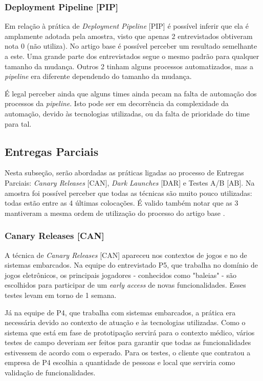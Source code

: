 \subsubsection{Deployment Pipeline [PIP]}

Em relação à prática de \emph{Deployment Pipeline} [PIP] é possível inferir que ela é amplamente adotada pela amostra, visto que apenas 2 entrevistados obtiveram nota 0 (não utiliza). No artigo base \cite{empiricalStudy2016} é possível perceber um resultado semelhante a este. Uma grande parte dos entrevistados segue o mesmo padrão para qualquer tamanho da mudança. Outros 2 tinham alguns processos automatizados, mas a \emph{pipeline} era diferente dependendo do tamanho da mudança.

É legal perceber ainda que alguns times ainda pecam na falta de automação dos processos da \emph{pipeline}. Isto pode ser em decorrência da complexidade da automação, devido às tecnologias utilizadas, ou da falta de prioridade do time para tal.
 
\subsection{Entregas Parciais}

Nesta subseção, serão abordadas as práticas ligadas ao processo de Entregas Parciais: \emph{Canary Releases} [CAN], \emph{Dark Launches} [DAR] e Testes A/B [AB]. Na amostra foi possível perceber que todas as técnicas são muito pouco utilizadas: todas estão entre as 4 últimas colocações. É valido também notar que as 3 mantiveram a mesma ordem de utilização do processo do artigo base \cite{empiricalStudy2016}.

\subsubsection{Canary Releases [CAN]}

A técnica de \emph{Canary Releases} [CAN] apareceu nos contextos de jogos e no de sistemas embarcados. Na equipe do entrevistado P5, que trabalha no domínio de jogos eletrônicos, os principais jogadores - conhecidos como "baleias" - são escolhidos para participar de um \emph{early access} de novas funcionalidades.  Esses testes levam em torno de 1 semana. 

Já na equipe de P4, que trabalha com sistemas embarcados, a prática era necessária devido ao contexto de atuação e às tecnologias utilizadas. Como o sistema que está em fase de prototipação servirá para o contexto médico, vários testes de campo deveriam ser feitos para garantir que todas as funcionalidades estivessem de acordo com o esperado. Para os testes, o cliente que contratou a empresa de P4 escolhia a quantidade de pessoas e local que serviria como validação de funcionalidades.

